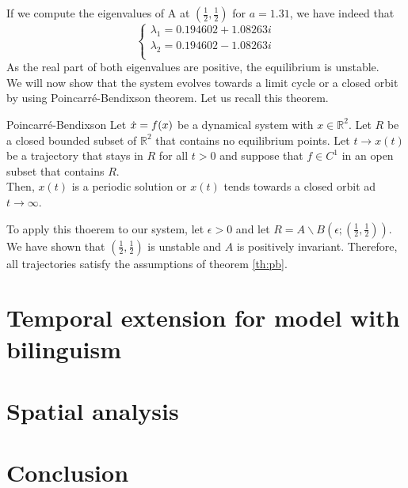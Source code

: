 \documentclass{article}
\begin{document}
If we compute the eigenvalues of A at $(\frac{1}{2}, \frac{1}{2})$ for $a=1.31$, we have indeed that
\[
\begin{cases}
\lambda_1 = 0.194602+1.08263i \\
\lambda_2 = 0.194602-1.08263i \\
\end{cases}
\]
As the real part of both eigenvalues are positive, the equilibrium is unstable. \\
We will now show that the system evolves towards a limit cycle or a closed orbit by using Poincarré-Bendixson theorem.
Let us recall this theorem. \\

\begin{theorem}{Poincarré-Bendixson}
\label{th:pb}
Let $\dot{x} = f(x)$ be a dynamical system with $x \in \mathbb{R}^2$. Let $R$ be a closed bounded subset of $\mathbb{R}^2$ that contains no equilibrium points. Let $t\rightarrow x(t)$ be a trajectory that stays in $R$ for all $t > 0$ and suppose that $f \in C^1$ in an open subset that contains $R$.\\
Then, $x(t)$ is a periodic solution or $x(t)$ tends towards a closed orbit ad $t \rightarrow \infty$.
\end{theorem}

To apply this thoerem to our system, let $\epsilon > 0$ and let $R = A \backslash B(\epsilon;(\frac{1}{2},\frac{1}{2}))$. We have shown that $(\frac{1}{2},\frac{1}{2})$ is unstable and $A$ is positively invariant. Therefore, all trajectories satisfy the assumptions of theorem \ref{th:pb}.

\section{Temporal extension for model with bilinguism}
\label{sec:2d}

\section{Spatial analysis}
\label{sec:spatial}

\section{Conclusion}
\label{sec:conclusion}





\end{document}
